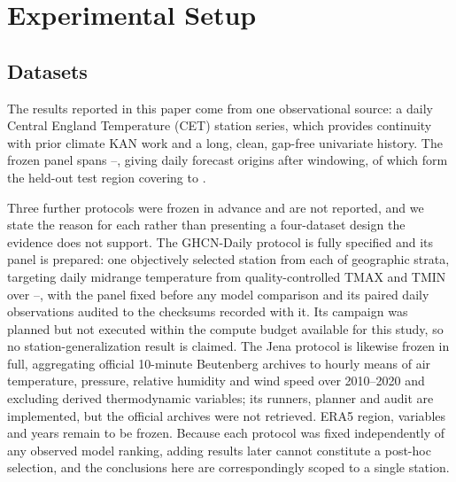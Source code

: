 \section{Experimental Setup}
\label{sec:experiments}

\subsection{Datasets}
The results reported in this paper come from one observational source: a daily Central England Temperature (CET) station series, which provides continuity with prior climate KAN work and a long, clean, gap-free univariate history. The frozen panel spans \cetFirstYear{}--\cetLastYear{}, giving \cetSamples{} daily forecast origins after windowing, of which \cetTestSamples{} form the held-out test region covering \cetTestStart{} to \cetTestEnd{}.

Three further protocols were frozen in advance and are not reported, and we state the reason for each rather than presenting a four-dataset design the evidence does not support. The GHCN-Daily protocol is fully specified and its panel is prepared: one objectively selected station from each of \ghcnStations{} geographic strata, targeting daily midrange temperature from quality-controlled TMAX and TMIN over \ghcnFirstYear{}--\ghcnLastYear{}, with the panel fixed before any model comparison and its \ghcnObservations{} paired daily observations audited to the checksums recorded with it. Its campaign was planned but not executed within the compute budget available for this study, so no station-generalization result is claimed. The Jena protocol is likewise frozen in full, aggregating official 10-minute Beutenberg archives to hourly means of air temperature, pressure, relative humidity and wind speed over 2010--2020 and excluding derived thermodynamic variables; its runners, planner and audit are implemented, but the official archives were not retrieved. ERA5 region, variables and years remain to be frozen. Because each protocol was fixed independently of any observed model ranking, adding results later cannot constitute a post-hoc selection, and the conclusions here are correspondingly scoped to a single station.

